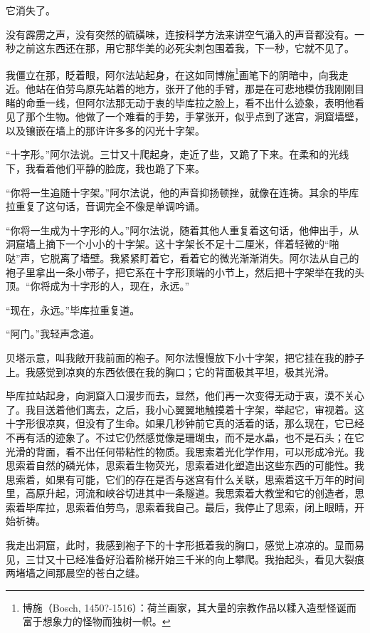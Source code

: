 \documentclass[AutoFakeBold=true]{book}
\begin{document}
它消失了。

没有霹雳之声，没有突然的硫磺味，连按科学方法来讲空气涌入的声音都没有。一秒之前这东西还在那，用它那华美的必死尖刺包围着我，下一秒，它就不见了。

我僵立在那，眨着眼，阿尔法站起身，在这如同博施\footnote{博施（Bosch, 1450?-1516）：荷兰画家，其大量的宗教作品以糅入造型怪诞而富于想象力的怪物而独树一帜。}画笔下的阴暗中，向我走近。他站在伯劳鸟原先站着的地方，张开了他的手臂，那是在可悲地模仿我刚刚目睹的命垂一线，但阿尔法那无动于衷的毕库拉之脸上，看不出什么迹象，表明他看见了那个生物。他做了一个难看的手势，手掌张开，似乎点到了迷宫，洞窟墙壁，以及镶嵌在墙上的那许许多多的闪光十字架。

``十字形。''阿尔法说。三廿又十爬起身，走近了些，又跪了下来。在柔和的光线下，我看着他们平静的脸庞，我也跪了下来。

``你将一生追随十字架。''阿尔法说，他的声音抑扬顿挫，就像在连祷。其余的毕库拉重复了这句话，音调完全不像是单调吟诵。

``你将一生成为十字形的人。''阿尔法说，随着其他人重复着这句话，他伸出手，从洞窟墙上摘下一个小小的十字架。这十字架长不足十二厘米，伴着轻微的``啪哒''声，它脱离了墙壁。我紧紧盯着它，看着它的微光渐渐消失。阿尔法从自己的袍子里拿出一条小带子，把它系在十字形顶端的小节上，然后把十字架举在我的头顶。``你将成为十字形的人，现在，永远。''

``现在，永远。''毕库拉重复道。

``阿门。''我轻声念道。

贝塔示意，叫我敞开我前面的袍子。阿尔法慢慢放下小十字架，把它挂在我的脖子上。我感觉到凉爽的东西依偎在我的胸口；它的背面极其平坦，极其光滑。

毕库拉站起身，向洞窟入口漫步而去，显然，他们再一次变得无动于衷，漠不关心了。我目送着他们离去，之后，我小心翼翼地触摸着十字架，举起它，审视着。这十字形很凉爽，但没有了生命。如果几秒钟前它真的活着的话，那么现在，它已经不再有活的迹象了。不过它仍然感觉像是珊瑚虫，而不是水晶，也不是石头；在它光滑的背面，看不出任何带粘性的物质。我思索着光化学作用，可以形成冷光。我思索着自然的磷光体，思索着生物荧光，思索着进化塑造出这些东西的可能性。我思索着，如果有可能，它们的存在是否与迷宫有什么关联，思索着这千万年的时间里，高原升起，河流和峡谷切进其中一条隧道。我思索着大教堂和它的创造者，思索着毕库拉，思索着伯劳鸟，思索着我自己。最后，我停止了思索，闭上眼睛，开始祈祷。

我走出洞窟，此时，我感到袍子下的十字形抵着我的胸口，感觉上凉凉的。显而易见，三廿又十已经准备好沿着阶梯开始三千米的向上攀爬。我抬起头，看见大裂痕两堵墙之间那晨空的苍白之缝。
\end{document}
